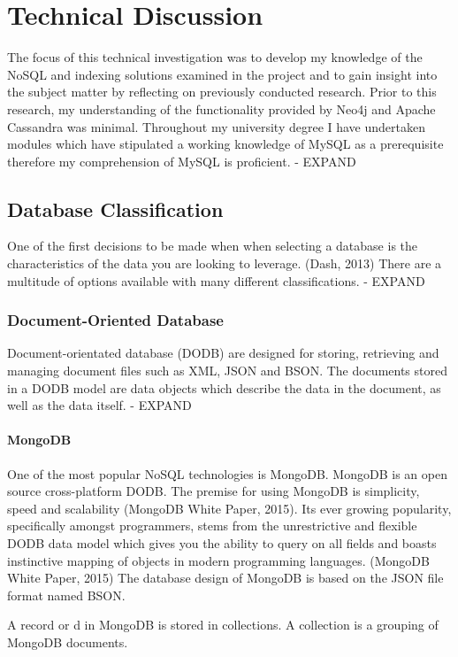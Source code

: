 \chapter{Technical Discussion}
The focus of this technical investigation was to develop my knowledge of the NoSQL and indexing solutions examined in the project and to gain insight into the subject matter by reflecting on previously conducted research. Prior to this research, my understanding of the functionality provided by Neo4j and Apache Cassandra was minimal. Throughout my university degree I have undertaken modules which have stipulated a working knowledge of MySQL as a prerequisite therefore my comprehension of MySQL is proficient. - EXPAND

\section{Database Classification}
One of the first decisions to be made when when selecting a database is the characteristics of the data you are looking to leverage. (Dash, 2013) There are a multitude of options available with many different classifications. - EXPAND

\subsection{Document-Oriented Database}
Document-orientated database (DODB) are designed for storing, retrieving and managing document files such as XML, JSON and BSON. The documents stored in a DODB model are data objects which describe the data in the document, as well as the data itself. - EXPAND

\subsubsection{MongoDB}\label{mongo}
One of the most popular NoSQL technologies is MongoDB. MongoDB is an open source cross-platform DODB. The premise for using MongoDB is simplicity, speed and scalability (MongoDB White Paper, 2015). Its ever growing popularity, specifically amongst programmers, stems from the unrestrictive and flexible DODB data model which gives you the ability to query on all fields and boasts instinctive mapping of objects in modern programming languages. (MongoDB White Paper, 2015) The database design of MongoDB is based on the JSON file format named BSON.

A record or d in MongoDB is stored in collections. A collection is a grouping of MongoDB documents. 

